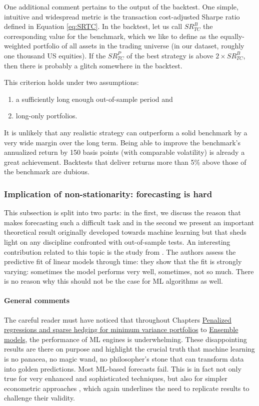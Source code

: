 One additional comment pertains to the output of the backtest. One simple, intuitive and widespread metric is the transaction cost-adjusted Sharpe ratio defined in Equation \ref{eq:SRTC}. In the backtest, let us call $SR_{TC}^B$ the corresponding value for the benchmark, which we like to define as the equally-weighted portfolio of all assets in the trading universe (in our dataset, roughly one thousand US equities). If the $SR_{TC}^P$ of the best strategy is above $2\times SR_{TC}^B$, then there is probably a glitch somewhere in the backtest.

This criterion holds under two assumptions:

\begin{enumerate}
\item a sufficiently long enough out-of-sample period and
\item long-only portfolios.
\end{enumerate}

It is unlikely that any realistic strategy can outperform a solid benchmark by a very wide margin over the long term. Being able to improve the benchmark's annualized return by 150 basis points (with comparable volatility) is already a great achievement. Backtests that deliver returns more than 5\% above those of the benchmark are dubious.

\subsubsection{Implication of non-stationarity: forecasting is hard}

This subsection is split into two parts: in the first, we discuss the reason that makes forecasting such a difficult task and in the second we present an important theoretical result originally developed towards machine learning but that sheds light on any discipline confronted with out-of-sample tests. An interesting contribution related to this topic is the study from \cite{farmer2019pockets}. The authors assess the predictive fit of linear models through time: they show that the fit is strongly varying: sometimes the model performs very well, sometimes, not so much. There is no reason why this should not be the case for ML algorithms as well.

\paragraph{General comments}

The careful reader must have noticed that throughout Chapters \href{/chap-06-lasso}{Penalized regressions and sparse hedging for minimum variance portfolios} to \href{/chap-14-ensemble}{Ensemble models}, the performance of ML engines is underwhelming. These disappointing results are there on purpose and highlight the crucial truth that machine learning is no panacea, no magic wand, no philosopher's stone that can transform data into golden predictions. Most ML-based forecasts fail. This is in fact not only true for very enhanced and sophisticated techniques, but also for simpler econometric approaches \citep{dichtl2019data}, which again underlines the need to replicate results to challenge their validity.

